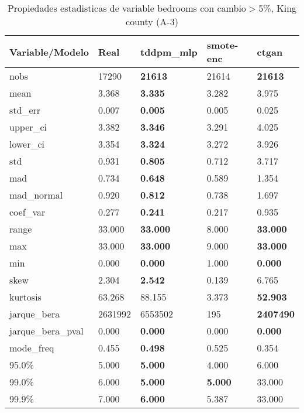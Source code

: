 \begin{table}[H]
\centering
\fontsize{8}{14}\selectfont
\caption{Propiedades estadisticas de variable bedrooms con cambio\ensuremath{>}5\%, King county (A-3)}
\label{table-stats-king county-a-3-bedrooms-short}
\begin{tabular}{|l|m{10em}|m{10em}|m{10em}|m{10em}|}
\hline
 \rowcolor[gray]{0.8}
Variable/Modelo & Real & tddpm\_mlp & smote-enc & ctgan \\
\hline nobs & 17290 & \bfseries 21613 & \cellcolor[rgb]{0.9, 0.54, 0.52} 21614 & \bfseries 21613 \\
\hline mean & 3.368 & \bfseries 3.335 & 3.282 & \cellcolor[rgb]{0.9, 0.54, 0.52} 3.975 \\
\hline std\_err & 0.007 & \bfseries 0.005 & 0.005 & \cellcolor[rgb]{0.9, 0.54, 0.52} 0.025 \\
\hline upper\_ci & 3.382 & \bfseries 3.346 & 3.291 & \cellcolor[rgb]{0.9, 0.54, 0.52} 4.025 \\
\hline lower\_ci & 3.354 & \bfseries 3.324 & 3.272 & \cellcolor[rgb]{0.9, 0.54, 0.52} 3.926 \\
\hline std & 0.931 & \bfseries 0.805 & 0.712 & \cellcolor[rgb]{0.9, 0.54, 0.52} 3.717 \\
\hline mad & 0.734 & \bfseries 0.648 & 0.589 & \cellcolor[rgb]{0.9, 0.54, 0.52} 1.354 \\
\hline mad\_normal & 0.920 & \bfseries 0.812 & 0.738 & \cellcolor[rgb]{0.9, 0.54, 0.52} 1.697 \\
\hline coef\_var & 0.277 & \bfseries 0.241 & 0.217 & \cellcolor[rgb]{0.9, 0.54, 0.52} 0.935 \\
\hline range & 33.000 & \bfseries 33.000 & \cellcolor[rgb]{0.9, 0.54, 0.52} 8.000 & \bfseries 33.000 \\
\hline max & 33.000 & \bfseries 33.000 & \cellcolor[rgb]{0.9, 0.54, 0.52} 9.000 & \bfseries 33.000 \\
\hline min & 0.000 & \bfseries 0.000 & \cellcolor[rgb]{0.9, 0.54, 0.52} 1.000 & \bfseries 0.000 \\
\hline skew & 2.304 & \bfseries 2.542 & 0.139 & \cellcolor[rgb]{0.9, 0.54, 0.52} 6.765 \\
\hline kurtosis & 63.268 & 88.155 & \cellcolor[rgb]{0.9, 0.54, 0.52} 3.373 & \bfseries 52.903 \\
\hline jarque\_bera & 2631992 & \cellcolor[rgb]{0.9, 0.54, 0.52} 6553502 & 195 & \bfseries 2407490 \\
\hline jarque\_bera\_pval & 0.000 & \bfseries 0.000 & \cellcolor[rgb]{0.9, 0.54, 0.52} 0.000 & \bfseries 0.000 \\
\hline mode\_freq & 0.455 & \bfseries 0.498 & 0.525 & \cellcolor[rgb]{0.9, 0.54, 0.52} 0.354 \\
\hline 95.0\% & 5.000 & \bfseries 5.000 & \cellcolor[rgb]{0.9, 0.54, 0.52} 4.000 & \cellcolor[rgb]{0.9, 0.54, 0.52} 6.000 \\
\hline 99.0\% & 6.000 & \bfseries 5.000 & \bfseries 5.000 & \cellcolor[rgb]{0.9, 0.54, 0.52} 33.000 \\
\hline 99.9\% & 7.000 & \bfseries 6.000 & 5.387 & \cellcolor[rgb]{0.9, 0.54, 0.52} 33.000 \\
\hline
\end{tabular}
\end{table}
